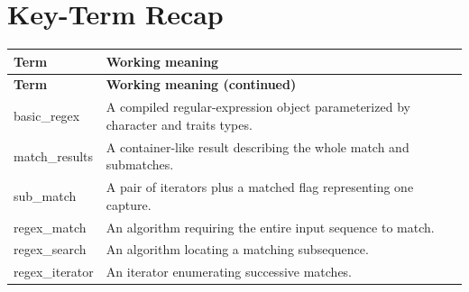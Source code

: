 \documentclass[11pt,letterpaper]{article}
\begin{document}
\section{Key-Term Recap}
\begin{longtable}{@{}>{\RaggedRight\arraybackslash}p{}>{\RaggedRight\arraybackslash}p{}@{}}\toprule\textbf{Term} & \textbf{Working meaning}\\\midrule\endfirsthead\toprule\textbf{Term} & \textbf{Working meaning (continued)}\\\midrule\endhead\bottomrule\endfoot
basic\_\allowbreak{}regex & A compiled regular-expression object parameterized by character and traits types.\\
match\_\allowbreak{}results & A container-like result describing the whole match and submatches.\\
sub\_\allowbreak{}match & A pair of iterators plus a matched flag representing one capture.\\
regex\_\allowbreak{}match & An algorithm requiring the entire input sequence to match.\\
regex\_\allowbreak{}search & An algorithm locating a matching subsequence.\\
regex\_\allowbreak{}iterator & An iterator enumerating successive matches.\\
\end{longtable}
\end{document}
